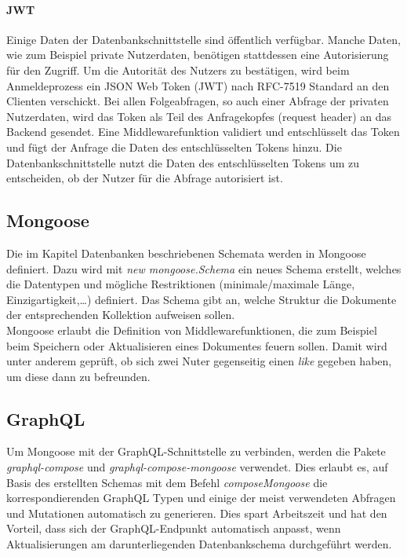 \paragraph{JWT\\}
Einige Daten der Datenbankschnittstelle sind öffentlich verfügbar.
Manche Daten, wie zum Beispiel private Nutzerdaten, benötigen stattdessen eine Autorisierung für den Zugriff.
Um die Autorität des Nutzers zu bestätigen, wird beim Anmeldeprozess ein JSON Web Token (JWT) nach RFC-7519 Standard an den Clienten verschickt\cite{be:rfc7519}.
Bei allen Folgeabfragen, so auch einer Abfrage der privaten Nutzerdaten, wird das Token als Teil des Anfragekopfes (request header) an das Backend gesendet.
Eine Middlewarefunktion validiert und entschlüsselt das Token und fügt der Anfrage die Daten des entschlüsselten Tokens hinzu.
Die Datenbankschnittstelle nutzt die Daten des entschlüsselten Tokens um zu entscheiden, ob der Nutzer für die Abfrage autorisiert ist.


\subsection{Mongoose}
Die im Kapitel Datenbanken beschriebenen Schemata werden in Mongoose definiert.
Dazu wird mit \textit{new mongoose.Schema} ein neues Schema erstellt, welches die Datentypen und mögliche Restriktionen (minimale/maximale Länge, Einzigartigkeit,\dots) definiert\cite{be:mongooseSchema}.
Das Schema gibt an, welche Struktur die Dokumente der entsprechenden Kollektion aufweisen sollen.\\
Mongoose erlaubt die Definition von Middlewarefunktionen, die zum Beispiel beim Speichern oder Aktualisieren eines Dokumentes feuern sollen\cite{be:mongooseMiddleware}.
Damit wird unter anderem geprüft, ob sich zwei Nuter gegenseitig einen \textit{like} gegeben haben, um diese dann zu befreunden.

\subsection{GraphQL}
Um Mongoose mit der GraphQL-Schnittstelle zu verbinden, werden die Pakete \textit{graphql-compose} und \textit{graphql-compose-mongoose} verwendet.
Dies erlaubt es, auf Basis des erstellten Schemas mit dem Befehl \textit{composeMongoose} die korrespondierenden GraphQL Typen und einige der meist verwendeten Abfragen und Mutationen automatisch zu generieren\cite{be:graphqlComposeMongoose}.
Dies spart Arbeitszeit und hat den Vorteil, dass sich der GraphQL-Endpunkt automatisch anpasst, wenn Aktualisierungen am darunterliegenden Datenbankschema durchgeführt werden.